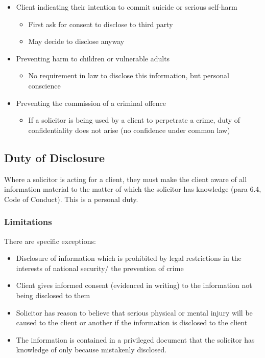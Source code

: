 \documentclass[
]{article}
\providecommand{\tightlist}{%
  \setlength{\itemsep}{0pt}\setlength{\parskip}{0pt}}
\begin{document}
\begin{itemize}
\tightlist
\item
  Client indicating their intention to commit suicide or serious
  self-harm

  \begin{itemize}
  \tightlist
  \item
    First ask for consent to disclose to third party
  \item
    May decide to disclose anyway
  \end{itemize}
\item
  Preventing harm to children or vulnerable adults

  \begin{itemize}
  \tightlist
  \item
    No requirement in law to disclose this information, but personal
    conscience
  \end{itemize}
\item
  Preventing the commission of a criminal offence

  \begin{itemize}
  \tightlist
  \item
    If a solicitor is being used by a client to perpetrate a crime, duty
    of confidentiality does not arise (no confidence under common law)
  \end{itemize}
\end{itemize}

\hypertarget{duty-of-disclosure}{%
\subsection{Duty of Disclosure}\label{duty-of-disclosure}}

Where a solicitor is acting for a client, they must make the client
aware of all information material to the matter of which the solicitor
has knowledge (para 6.4, Code of Conduct). This is a personal duty.

\hypertarget{limitations}{%
\subsubsection{Limitations}\label{limitations}}

There are specific exceptions:

\begin{itemize}
\tightlist
\item
  Disclosure of information which is prohibited by legal restrictions in
  the interests of national security/ the prevention of crime
\item
  Client gives informed consent (evidenced in writing) to the
  information not being disclosed to them
\item
  Solicitor has reason to believe that serious physical or mental injury
  will be caused to the client or another if the information is
  disclosed to the client
\item
  The information is contained in a privileged document that the
  solicitor has knowledge of only because mistakenly disclosed.
\end{itemize}
\end{document}
